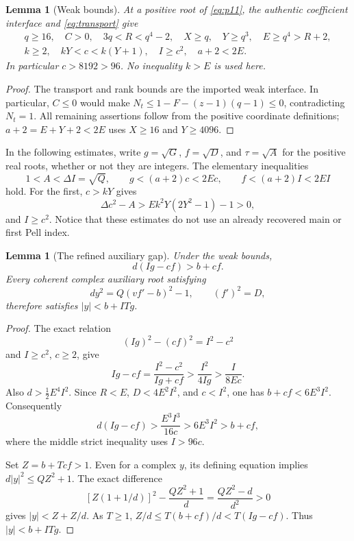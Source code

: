 \documentclass[11pt,a4paper]{article}
\newtheorem{lemma}[theorem]{Lemma}
\theoremstyle{definition}
\theoremstyle{remark}
\numberwithin{equation}{section}
\begin{document}
\begin{lemma}[Weak bounds]\label{lem:weak}
At a positive root of \eqref{eq:p11}, the authentic coefficient
interface and \eqref{eq:transport} give
\begin{gather*}
 q\ge16,\quad C>0,\quad 3q<R<q^4-2,\quad
 X\ge q,\quad Y\ge q^3,\quad E\ge q^4>R+2,\\
 k\ge2,\quad kY<c<k(Y+1),\quad I\ge c^2,\quad a+2<2E.
\end{gather*}
In particular $c>8192>96$. No inequality $k>E$ is used here.
\end{lemma}
\begin{proof}
The transport and rank bounds are the imported weak interface. In
particular, $C\le0$ would make
$N_t\le1-F-(z-1)(q-1)\le0$, contradicting $N_t=1$.
All remaining assertions follow from the positive coordinate definitions;
$a+2=E+Y+2<2E$ uses $X\ge16$ and $Y\ge4096$.
\end{proof}

In the following estimates, write $g=\sqrt G$, $f=\sqrt D$,
and $\tau=\sqrt A$ for the positive real roots, whether or not they
are integers. The elementary inequalities
\begin{equation}
 1<A<\Delta I=\sqrt Q,\qquad
 g<(a+2)c<2Ec,\qquad f<(a+2)I<2EI
 \label{eq:weak-radicals}
\end{equation}
hold. For the first, $c>kY$ gives
\[
 \Delta c^2-A>E k^2Y(2Y^2-1)-1>0,
\]
and $I\ge c^2$. Notice that these estimates do not use an already
recovered main or first Pell index.

\begin{lemma}[The refined auxiliary gap]\label{lem:gap}
Under the weak bounds,
\[
 d(Ig-cf)>b+cf.
\]
Every coherent complex auxiliary root satisfying
\[
 d y^2=Q(vf'-b)^2-1,
 \qquad (f')^2=D,
\]
therefore satisfies $|y|<b+ITg$.
\end{lemma}
\begin{proof}
The exact relation
\[
 (Ig)^2-(cf)^2=I^2-c^2
\]
and $I\ge c^2$, $c\ge2$, give
\[
 Ig-cf=\frac{I^2-c^2}{Ig+cf}
 >\frac{I^2}{4Ig}>\frac{I}{8Ec}.
\]
Also $d>\tfrac12E^4I^2$. Since $R<E$, $D<4E^2I^2$,
and $c<I^2$, one has $b+cf<6E^3I^2$. Consequently
\[
 d(Ig-cf)>\frac{E^3I^3}{16c}>6E^3I^2>b+cf,
\]
where the middle strict inequality uses $I>96c$.

Set $Z=b+Tcf>1$. Even for a complex $y$, its defining equation
implies $d|y|^2\le QZ^2+1$. The exact difference
\[
 [Z(1+1/d)]^2-\frac{QZ^2+1}{d}
 =\frac{QZ^2-d}{d^2}>0
\]
gives $|y|<Z+Z/d$. As $T\ge1$,
$Z/d\le T(b+cf)/d<T(Ig-cf)$. Thus $|y|<b+ITg$.
\end{proof}
\end{document}
